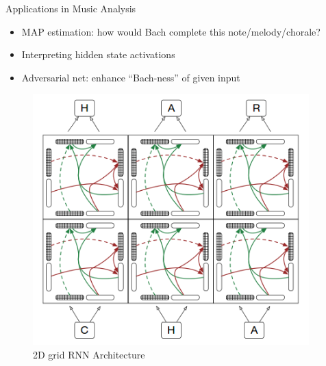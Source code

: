 \documentclass[final]{beamer}
\newlength{\onecolwid}
\newlength{\twocolwid}
\begin{document}
\begin{frame}[t]
\begin{columns}[t]
\begin{column}{\twocolwid}
\begin{columns}[t,totalwidth=\twocolwid]
\begin{column}{\onecolwid}

\end{column} %

\begin{column}{\onecolwid} %


\begin{block}{Applications in Music Analysis}
  \begin{itemize}
    \item MAP estimation: how would Bach complete this note/melody/chorale?
    \item Interpreting hidden state activations
    \item Adversarial net: enhance ``Bach-ness'' of given input
  \end{itemize}
\end{block}

\begin{figure}
  \includegraphics[width=0.95\linewidth]{grid-lstm.png}
  \caption{2D grid RNN Architecture\cite{DBLP:journals/corr/KalchbrennerDG15}}
\end{figure}



\end{column}
\end{columns}
\end{column}
\end{columns}
\end{frame}
\end{document}
